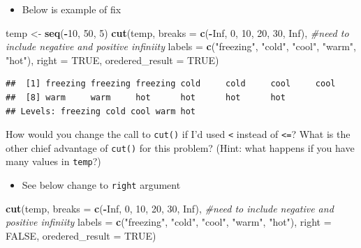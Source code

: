 \documentclass[]{book}
\newenvironment{Shaded}{\begin{snugshade}}{\end{snugshade}}
\newcommand{\CommentTok}[1]{\textcolor[rgb]{0.56,0.35,0.01}{\textit{#1}}}
\newcommand{\DataTypeTok}[1]{\textcolor[rgb]{0.13,0.29,0.53}{#1}}
\newcommand{\DecValTok}[1]{\textcolor[rgb]{0.00,0.00,0.81}{#1}}
\newcommand{\KeywordTok}[1]{\textcolor[rgb]{0.13,0.29,0.53}{\textbf{#1}}}
\newcommand{\NormalTok}[1]{#1}
\newcommand{\OperatorTok}[1]{\textcolor[rgb]{0.81,0.36,0.00}{\textbf{#1}}}
\newcommand{\OtherTok}[1]{\textcolor[rgb]{0.56,0.35,0.01}{#1}}
\newcommand{\StringTok}[1]{\textcolor[rgb]{0.31,0.60,0.02}{#1}}
\providecommand{\tightlist}{%
  \setlength{\itemsep}{0pt}\setlength{\parskip}{0pt}}
\theoremstyle{definition}
\theoremstyle{definition}
\theoremstyle{definition}
\theoremstyle{remark}
\begin{document}
\begin{enumerate}
  \begin{itemize}
  \tightlist
  \item
    Below is example of fix
  \end{itemize}

\begin{Shaded}
\begin{Highlighting}[]
\NormalTok{temp <-}\StringTok{ }\KeywordTok{seq}\NormalTok{(}\OperatorTok{-}\DecValTok{10}\NormalTok{, }\DecValTok{50}\NormalTok{, }\DecValTok{5}\NormalTok{)}
\KeywordTok{cut}\NormalTok{(temp, }
    \DataTypeTok{breaks =} \KeywordTok{c}\NormalTok{(}\OperatorTok{-}\OtherTok{Inf}\NormalTok{, }\DecValTok{0}\NormalTok{, }\DecValTok{10}\NormalTok{, }\DecValTok{20}\NormalTok{, }\DecValTok{30}\NormalTok{, }\OtherTok{Inf}\NormalTok{),  }\CommentTok{#need to include negative and positive infiniity}
    \DataTypeTok{labels =} \KeywordTok{c}\NormalTok{(}\StringTok{"freezing"}\NormalTok{, }\StringTok{"cold"}\NormalTok{, }\StringTok{"cool"}\NormalTok{, }\StringTok{"warm"}\NormalTok{, }\StringTok{"hot"}\NormalTok{),}
    \DataTypeTok{right =} \OtherTok{TRUE}\NormalTok{,}
    \DataTypeTok{oredered_result =} \OtherTok{TRUE}\NormalTok{)}
\end{Highlighting}
\end{Shaded}

\begin{verbatim}
##  [1] freezing freezing freezing cold     cold     cool     cool    
##  [8] warm     warm     hot      hot      hot      hot     
## Levels: freezing cold cool warm hot
\end{verbatim}

  How would you change the call to \texttt{cut()} if I'd used
  \texttt{\textless{}} instead of \texttt{\textless{}=}? What is the
  other chief advantage of \texttt{cut()} for this problem? (Hint: what
  happens if you have many values in \texttt{temp}?)

  \begin{itemize}
  \tightlist
  \item
    See below change to \texttt{right} argument
  \end{itemize}

\begin{Shaded}
\begin{Highlighting}[]
\KeywordTok{cut}\NormalTok{(temp, }
    \DataTypeTok{breaks =} \KeywordTok{c}\NormalTok{(}\OperatorTok{-}\OtherTok{Inf}\NormalTok{, }\DecValTok{0}\NormalTok{, }\DecValTok{10}\NormalTok{, }\DecValTok{20}\NormalTok{, }\DecValTok{30}\NormalTok{, }\OtherTok{Inf}\NormalTok{),  }\CommentTok{#need to include negative and positive infiniity}
    \DataTypeTok{labels =} \KeywordTok{c}\NormalTok{(}\StringTok{"freezing"}\NormalTok{, }\StringTok{"cold"}\NormalTok{, }\StringTok{"cool"}\NormalTok{, }\StringTok{"warm"}\NormalTok{, }\StringTok{"hot"}\NormalTok{),}
    \DataTypeTok{right =} \OtherTok{FALSE}\NormalTok{,}
    \DataTypeTok{oredered_result =} \OtherTok{TRUE}\NormalTok{)}
\end{Highlighting}
\end{Shaded}


\end{enumerate}
\end{document}
